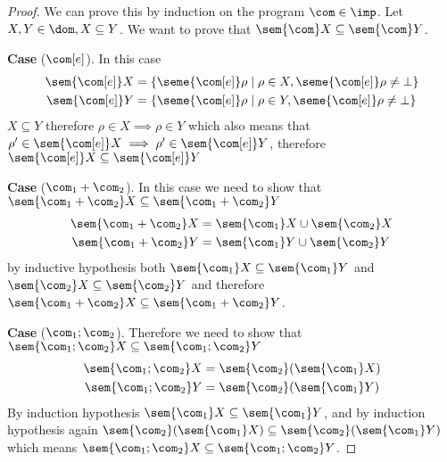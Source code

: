 \begin{proof}
  We can prove this by induction on the program \(\com\in\imp\). Let
  \(X, Y\in\dom, X \subseteq Y\). We want to prove that
  \(\sem{\com}X \subseteq \sem{\com}Y\).

  \medskip

  \noindent
  \textbf{Case} (\(\com[e]\)). In this case
  \begin{align*}
    \sem{\com[e]}X & = \{\seme{\com[e]}\rho \mid \rho \in X , \seme{\com[e]}\rho \neq \bot\} \\
    \sem{\com[e]}Y & = \{\seme{\com[e]}\rho \mid \rho \in Y , \seme{\com[e]}\rho \neq \bot\}
  \end{align*}
  \(X\subseteq Y\) therefore \(\rho \in X \implies \rho \in Y\)
  which also means that
  \(\rho' \in \sem{\com[e]}X \implies \rho' \in \sem{\com[e]}Y\),
  therefore \(\sem{\com[e]}X \subseteq \sem{\com[e]}Y\)

  \medskip

  \noindent
  \textbf{Case} (\(\com_1 + \com_2\)). In this case we need
  to show that \(\sem{\com_1+\com_2}X \subseteq \sem{\com_1+\com_2}Y \)
  \begin{align*}
    \sem{\com_1 + \com_2}X & = \sem{\com_1}X \cup \sem{\com_2}X \\
    \sem{\com_1 + \com_2}Y & = \sem{\com_1}Y \cup \sem{\com_2}Y
  \end{align*}
  by inductive hypothesis both
  \(\sem{\com_1}X \subseteq \sem{\com_1}Y\) and
  \(\sem{\com_2}X \subseteq \sem{\com_2}Y\) and therefore
  \(\sem{\com_1 + \com_2}X \subseteq \sem{\com_1 + \com_2}Y\).

  \medskip

  \noindent
  \textbf{Case} (\(\com_1 ; \com_2\)). Therefore we need to show that
  \(\sem{\com_1;\com_2}X \subseteq \sem{\com_1;\com_2}Y \)
  \begin{align*}
    \sem{\com_1 ; \com_2}X & = \sem{\com_2}(\sem{\com_1}X) \\
    \sem{\com_1 ; \com_2}Y & = \sem{\com_2}(\sem{\com_1}Y)
  \end{align*}
  By induction hypothesis
  \(\sem{\com_1} X \subseteq \sem{\com_1}Y\), and by induction
  hypothesis again
  \(\sem{\com_2}(\sem{\com_1} X) \subseteq \sem{\com_2}(\sem{\com_1}
  Y)\) which means
  \(\sem{\com_1 ; \com_2} X \subseteq \sem{\com_1 ; \com_2}Y\).

  \medskip


\end{proof}
